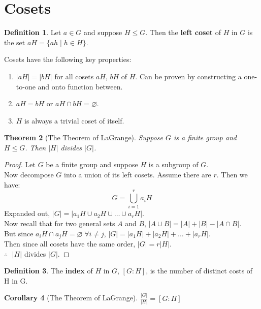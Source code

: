 \documentclass[11pt]{amsart}
\newtheorem{theorem}{Theorem}[section]
\theoremstyle{definition}
\newtheorem{definition}[theorem]{Definition}
\newtheorem{corollary}[theorem]{Corollary}
\let\emptyset\varnothing
\begin{document}
\section{Cosets}
\begin{definition}
	Let $a \in G$ and suppose $H \leq G$. Then the \textbf{left coset} of $H$ in $G$ is the set $aH = \{ ah \; | \; h \in H \}$.
\end{definition}
Cosets have the following key properties:
\begin{enumerate}
	\item{$| aH | = | bH |$ for all cosets $aH$, $bH$ of $H$. Can be proven by constructing a one-to-one and onto function between.}
	\item{$aH = bH$ or $aH \cap bH = \emptyset$.}
	\item{$H$ is always a trivial coset of itself.}
\end{enumerate}
\begin{theorem}[The Theorem of LaGrange]
	Suppose $G$ is a finite group and $H \leq G$. Then $| H |$ divides $| G |$.
\end{theorem}
\begin{proof}
	Let $G$ be a finite group and suppose $H$ is a subgroup of $G$. \\
	Now decompose $G$ into a union of its left cosets. Assume there are $r$. Then we have: 
	\[ G = \bigcup_{i = 1}^{r} a_i H \]
	Expanded out, $| G | = | a_1 H \cup a_2 H \cup \dots \cup a_r H |$. \\
	Now recall that for two general sets $A$ and $B$, $| A \cup B | = |A| + |B| - |A \cap B|$. \\
	But since $a_i H \cap a_j H = \emptyset \; \forall i \neq j$, $| G | = | a_1 H | + | a_2 H | + \dots + | a_r H |$. \\
	Then since all cosets have the same order, $| G | = r | H |$. \\
	$\therefore \;$ $| H |$ divides $| G |$.	
\end{proof}
\begin{definition}
	The \textbf{index} of $H$ in $G$, $[ G: H ]$, is the number of distinct costs of H in G.
\end{definition}
\begin{corollary}[The Theorem of LaGrange]
	$\frac{|G|}{|H|} = [G : H]$
\end{corollary}
\end{document}
